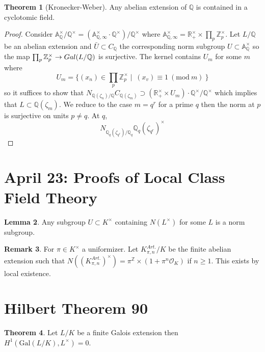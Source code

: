 \documentclass[12pt]{extarticle}
\newcommand{\Z}{\mathbb{Z}}
\newcommand{\Q}{\mathbb{Q}}
\newcommand{\R}{\mathbb{R}}
\renewcommand{\mod}[3]{\: #1 \equiv #2 \: (\mathrm{mod} \: #3) \:}
\newcommand{\galgroup}[1]{Gal \small(#1 \small)}
\newcommand{\ints}[1]{\mathcal{O}_{#1}}
\theoremstyle{definition}
\newtheorem{theorem}{Theorem}[section]
\newtheorem{lemma}[theorem]{Lemma}
\newtheorem{remark}[theorem]{Remark}
\begin{document}
\begin{theorem}[Kronecker-Weber]
Any abelian extension of $\Q$ is contained in a cyclotomic field.
\end{theorem}

\begin{proof}
Consider $\mathbb{A}_{\Q}^\times / \Q^\times = \left( \mathbb{A}_{\Q, \infty}^\times \cdot \Q^\times \right) / \Q^\times$ where $\mathbb{A}_{\Q, \infty}^\times = \R_{+}^\times \times \prod_{p} \Z_p^\times$. Let $L/\Q$ be an abelian extension and $\bar{U} \subset C_\Q$ the corresponding norm subgroup $U \subset \mathbb{A}^\times_{\Q}$ so the map $\prod_p \Z_p^\times \to \galgroup{L / \Q}$ is surjective. The kernel contains $U_m$ for some $m$ where \[U_m = \{ (x_n) \in \prod_{p} \Z_p^\times \mid \mod{(x_v)}{1}{m} \}\]
so it suffices to show that $N_{ \Q(\zeta_n)/\Q } C_{\Q(\zeta_m)} \supset (\R_+^\times \times U_m) \cdot \Q^\times / \Q^\times$ which implies that $L \subset \Q(\zeta_m)$. We reduce to the case $m = q^r$ for a prime $q$ then the norm at $p$ is surjective on units $p \neq q$. At $q$,
\[ N_{\Q_q(\zeta_{q^r}) / \Q_q} \Q_q (\zeta_{q^r})^\times \]   
\end{proof}

\section{April 23: Proofs of Local Class Field Theory}

\begin{lemma}
Any subgroup $U \subset K^\times$ containing $N(L^\times)$ for some $L$ is a norm subgroup. 
\end{lemma}

\begin{remark}
For $\pi \in K^\times$ a uniformizer. Let $K_{\pi, n}^{Art.} / K$ be the finite abelian extension such that $N((K_{\pi, n}^{Art.})^\times) = \pi^\Z \times (1 + \pi^n \ints{K})$ if $n \ge 1$. This exists by local existence. 
\end{remark}


\section{Hilbert Theorem 90}

\newcommand{\Gal}[1]{\mathrm{Gal} (#1)}
\newcommand{\Nm}{\mathrm{Nm}}
\newcommand{\Tr}{\mathrm{Tr}}
\newcommand{\Frob}{\mathrm{Frob}}
\newcommand{\m}{\mathfrak{m}}
\newcommand{\inv}{\mathrm{inv}}

\begin{theorem}
Let $L / K$ be a finite Galois extension then $H^1(\Gal{L/K}, L^\times) = 0$.
\end{theorem}
\end{document}
